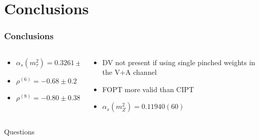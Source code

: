 \documentclass[fleqn]{beamer}
\begin{document}
\section{Conclusions}
\begin{frame}
  \frametitle{Conclusions}
  \begin{columns}
    \begin{column}{.5\textwidth}
      \begin{itemize}
      \item \(\alpha_s(m_\tau^2) = 0.3261 \pm 0.0050\)
      \item \(\rho^{(6)} = -0.68 \pm 0.2\)
      \item \(\rho^{(8)} = -0.80 \pm 0.38\)
      \end{itemize}
    \end{column} \pause
    \begin{column}{.5\textwidth}
      \begin{itemize}
      \item DV not present if using single pinched weights in the V+A channel
      \item FOPT more valid than CIPT
      \item \(\alpha_s(m_Z^2) = 0.11940(60)\)
      \end{itemize}
    \end{column}
  \end{columns}
\end{frame}


\begin{frame}
  \centering
  \LARGE
  Questions
\end{frame}
\end{document}
